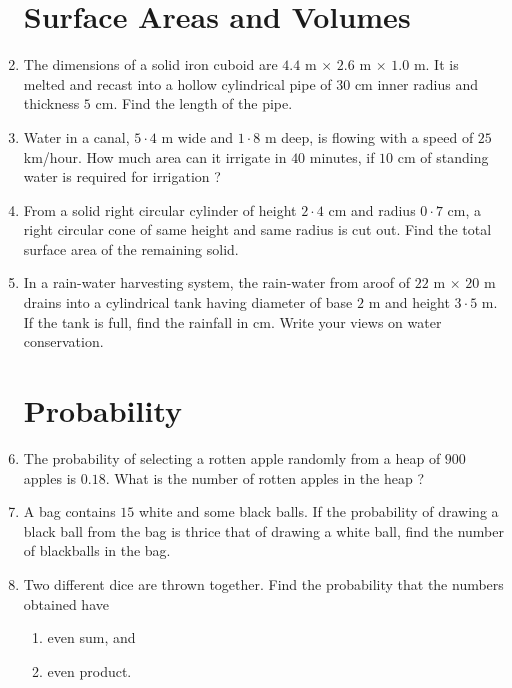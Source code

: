 \documentclass{article}
\begin{document}
\begin{enumerate}
\section*{Surface Areas and Volumes}
\item The dimensions of a solid iron cuboid are $4.4$ m $\times$ $2.6$ m $\times$ $1.0$ m. It is melted and recast into a hollow cylindrical pipe of $30$ cm inner radius and thickness $5$ cm. Find the length of the pipe. 
\item Water in a canal, $5·4$ m wide and $1·8$ m deep, is flowing with a speed of $25$ km/hour. How much area can it irrigate in $40$ minutes, if $10$ cm of standing water is required for irrigation ?
\item From a solid right circular cylinder of height $2·4$ cm and radius $0·7$ cm, a right circular cone of same height and same radius is cut out. Find the total surface area of the remaining solid.
\item In a rain-water harvesting system, the rain-water from aroof of $22 $ m $\times$ $20$ m drains into a cylindrical tank having diameter of base $2$ m  and height $3·5$ m. If the tank is full, find the rainfall in cm. Write your views on water conservation.

\section*{Probability}
\item The probability of selecting a rotten apple randomly from a heap of $900$ apples is $0.18$. What is the number of rotten apples in the heap ?
\item A bag contains $15$ white and some black balls. If the probability of drawing a black ball from the bag is thrice that of drawing a white ball, find the number of blackballs in the bag.
\item Two different dice are thrown together. Find the probability that the numbers obtained have
\begin{enumerate}[label=\roman*]
\item even sum, and
\item even product.
\end{enumerate} 
\end{enumerate}
\end{document}
